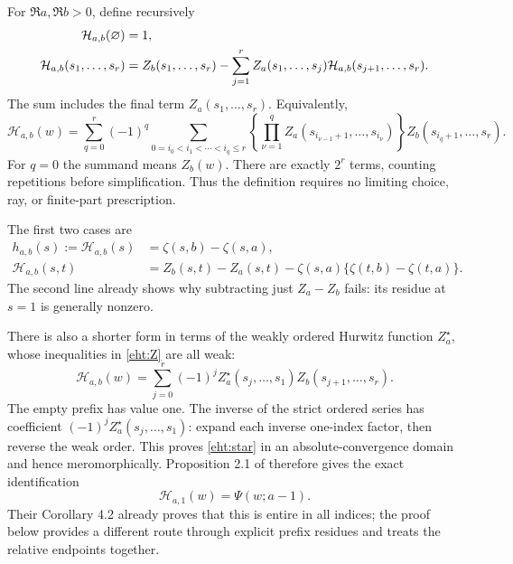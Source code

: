 For $\Re a,\Re b>0$, define recursively
\begin{align}
 \mathcal H_{a,b}(\varnothing)&=1,\notag\\
 \mathcal H_{a,b}(s_1,\ldots,s_r)
 &=Z_b(s_1,\ldots,s_r)
   -\sum_{j=1}^rZ_a(s_1,\ldots,s_j)
                    \mathcal H_{a,b}(s_{j+1},\ldots,s_r).
 \label{eht:rec}
\end{align}
The sum includes the final term $Z_a(s_1,\ldots,s_r)$.  Equivalently,
\begin{equation}\label{eht:finite}
 \mathcal H_{a,b}(w)=
 \sum_{q=0}^r(-1)^q
 \sum_{0=i_0<i_1<\cdots<i_q\le r}
 \left\{\prod_{\nu=1}^q
   Z_a(s_{i_{\nu-1}+1},\ldots,s_{i_\nu})\right\}
 Z_b(s_{i_q+1},\ldots,s_r).
\end{equation}
For $q=0$ the summand means $Z_b(w)$.  There are exactly $2^r$ terms,
counting repetitions before simplification.  Thus the definition requires
no limiting choice, ray, or finite-part prescription.

The first two cases are
\begin{align}
 h_{a,b}(s):=\mathcal H_{a,b}(s)
   &=\zeta(s,b)-\zeta(s,a),\label{eht:h}\\
 \mathcal H_{a,b}(s,t)
   &=Z_b(s,t)-Z_a(s,t)-\zeta(s,a)
                         \{\zeta(t,b)-\zeta(t,a)\}.
 \label{eht:depthtwo}
\end{align}
The second line already shows why subtracting just $Z_a-Z_b$ fails:
its residue at $s=1$ is generally nonzero.

There is also a shorter form in terms of the weakly ordered Hurwitz
function $Z_a^\star$, whose inequalities in \eqref{eht:Z} are all weak:
\begin{equation}\label{eht:star}
 \mathcal H_{a,b}(w)=\sum_{j=0}^r(-1)^j
       Z_a^\star(s_j,\ldots,s_1)Z_b(s_{j+1},\ldots,s_r).
\end{equation}
The empty prefix has value one.  The inverse of the strict ordered series
has coefficient $(-1)^jZ_a^\star(s_j,\ldots,s_1)$: expand each inverse
one-index factor, then reverse the weak order.  This proves
\eqref{eht:star} in an absolute-convergence domain and hence meromorphically.
Proposition 2.1 of \cite{eht:INY} therefore gives the exact identification
\begin{equation}\label{eht:INY}
                 \mathcal H_{a,1}(w)=\Psi(w;a-1).
\end{equation}
Their Corollary 4.2 already proves that this is entire in all indices;
the proof below provides a different route through explicit prefix
residues and treats the relative endpoints together.

